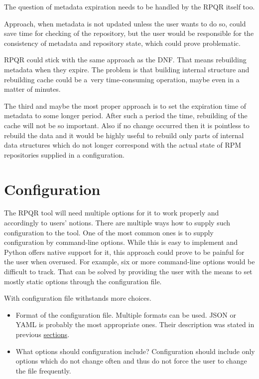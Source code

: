 The question of metadata expiration needs to be handled by the RPQR itself too.

Approach, when metadata is not updated unless the user wants to do so, could save time for
checking of the repository, but the user would be responsible for the consistency of metadata and repository
state, which could prove problematic.

RPQR could stick with the same approach as the DNF. That means rebuilding metadata when they expire.
The problem is that building internal structure and rebuilding cache could be a~very time-consuming
operation, maybe even in a matter of minutes.

The third and maybe the most proper approach is to set the expiration time of metadata to some
longer period. After such a period the time, rebuilding of the cache will not be so important.
Also if no change occurred then it is pointless to rebuild the data and it would be highly useful
to rebuild only parts of internal data structures which do not longer correspond with the actual state
of RPM repositories supplied in a configuration.

\section{Configuration}
The RPQR tool will need multiple options for it to work properly and accordingly to
users' notions. There are multiple ways how to supply such configuration to the tool. One of the
most common ones is to supply configuration by command-line options. While this is easy to implement
and Python offers native support for it, this approach could prove to be painful for the user when
overused. For example, six or more command-line options would be difficult to track. That can be solved
by providing the user with the means to set mostly static options through the configuration file.

With configuration file withstands more choices.
\begin{itemize}
  \item Format of the configuration file.
        Multiple formats can be used. JSON or YAML is probably the most appropriate ones.
        Their description was stated in previous \hyperref[sec:dataformats]{sections}.
  \item What options should configuration include?
        Configuration should include only options which do not change often and thus do not force
        the user to change the file frequently.
\end{itemize}

